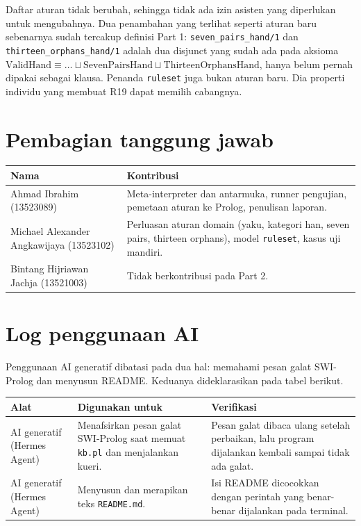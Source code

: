 \documentclass[11pt,a4paper]{article}
\newcommand{\code}[1]{\texttt{#1}}
\begin{document}
Daftar aturan tidak berubah, sehingga tidak ada izin asisten yang diperlukan untuk mengubahnya.
Dua penambahan yang terlihat seperti aturan baru sebenarnya sudah tercakup definisi Part 1:
\code{seven\_pairs\_hand/1} dan \code{thirteen\_orphans\_hand/1} adalah dua disjunct yang
sudah ada pada aksioma $\text{ValidHand} \equiv \dots \sqcup \text{SevenPairsHand} \sqcup
\text{ThirteenOrphansHand}$, hanya belum pernah dipakai sebagai klausa. Penanda
\code{ruleset} juga bukan aturan baru. Dia properti individu yang membuat R19 dapat
memilih cabangnya.

\section{Pembagian tanggung jawab}

\begin{table}[h]
\centering\small
\begin{tabular}{@{}p{5.2cm}p{9.3cm}@{}}
\toprule
Nama & Kontribusi \\
\midrule
Ahmad Ibrahim (13523089) & Meta-interpreter dan antarmuka, runner pengujian, pemetaan
aturan ke Prolog, penulisan laporan. \\
Michael Alexander Angkawijaya (13523102) & Perluasan aturan domain (yaku, kategori han,
seven pairs, thirteen orphans), model \code{ruleset}, kasus uji mandiri. \\
Bintang Hijriawan Jachja (13521003) & Tidak berkontribusi pada Part 2. \\
\bottomrule
\end{tabular}
\end{table}

\clearpage
\section{Log penggunaan AI}

Penggunaan AI generatif dibatasi pada dua hal: memahami pesan galat SWI-Prolog dan
menyusun README. Keduanya dideklarasikan pada tabel berikut.

\begin{center}\small
\begin{tabular}{@{}p{3.4cm}p{5.4cm}p{5.6cm}@{}}
\toprule
Alat & Digunakan untuk & Verifikasi \\
\midrule
AI generatif (Hermes Agent) &
Menafsirkan pesan galat SWI-Prolog saat memuat \code{kb.pl} dan menjalankan kueri. &
Pesan galat dibaca ulang setelah perbaikan, lalu program dijalankan kembali sampai
tidak ada galat. \\
AI generatif (Hermes Agent) &
Menyusun dan merapikan teks \code{README.md}. &
Isi README dicocokkan dengan perintah yang benar-benar dijalankan pada terminal. \\
\bottomrule
\end{tabular}
\end{center}
\end{document}
